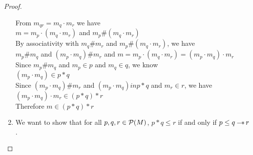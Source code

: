 \begin{proof}
\begin{enumerate}
\begin{tabbedproof}
    \ooooo From $m_{qr} = m_q \cdot m_r$ we have \\
    \ooooox $m = m_p \cdot (m_q \cdot m_r)$ and $m_p \# (m_q \cdot m_r)$ \\
    \ooooo By associativity with $m_q \# m_{r}$ and $m_p \# (m_q \cdot m_r)$, we have \\
    \ooooox $m_p \# m_q$ and $(m_p \cdot m_q) \# m_r$ and 
            $m = m_p \cdot (m_q \cdot m_r) = (m_p \cdot m_q) \cdot m_r$ \\
    \ooooo Since $m_p \# m_q$ and $m_p \in p$ and $m_q \in q$, we know \\
    \ooooox $(m_p \cdot m_q) \in p * q$ \\
    \ooooo Since $(m_p \cdot m_q) \# m_r$ and $(m_p \cdot m_q) in p * q$ and $m_r \in r$, we have \\ 
    \ooooox $(m_p \cdot m_q) \cdot m_r \in (p * q) * r$ \\
    \ooooo Therefore $m \in (p * q) * r$ \\
  \end{tabbedproof}

\item We want to show that for all $p, q, r \in \mathcal{P}(M)$, $p * q \leq r$ if and
only if $p \leq q -\!\!*\, r$. 


\end{enumerate}
\end{proof}
